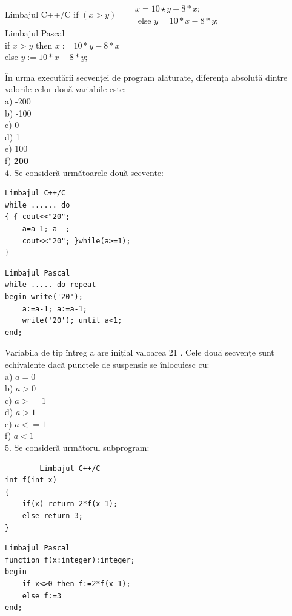 \documentclass[10pt]{article}
\begin{document}
\begin{displayquote}
Limbajul C++/C if $(x>y) \quad \begin{aligned} & x=10 \star y-8 * x ; \\ & \text { else } y=10 * x-8 * y ;\end{aligned}$\\
Limbajul Pascal\\
if $x>y$ then $x:=10 * y-8 * x$\\
else $y:=10 * x-8 * y$;
\end{displayquote}

În urma executării secvenței de program alăturate, diferența absolută dintre valorile celor două variabile este:\\
a) -200\\
b) -100\\
c) 0\\
d) 1\\
e) 100\\
f) $\mathbf{2 0 0}$\\
4. Se consideră următoarele două secvențe:

\begin{verbatim}
Limbajul C++/C
while ...... do
{ { cout<<"20";
    a=a-1; a--;
    cout<<"20"; }while(a>=1);
}
\end{verbatim}

\begin{verbatim}
Limbajul Pascal
while ..... do repeat
begin write('20');
    a:=a-1; a:=a-1;
    write('20'); until a<1;
end;
\end{verbatim}

Variabila de tip întreg a are inițial valoarea 21 . Cele două secvenţe sunt echivalente dacă punctele de suspensie se înlocuiesc cu:\\
a) $a=0$\\
b) $a>0$\\
c) $a>=1$\\
d) $a>1$\\
e) $a<=1$\\
f) $a<1$\\
5. Se consideră următorul subprogram:

\begin{verbatim}
        Limbajul C++/C
int f(int x)
{
    if(x) return 2*f(x-1);
    else return 3;
}
\end{verbatim}

\begin{verbatim}
Limbajul Pascal
function f(x:integer):integer;
begin
    if x<>0 then f:=2*f(x-1);
    else f:=3
end;
\end{verbatim}
\end{document}
